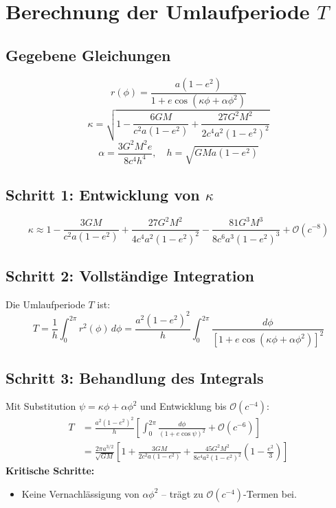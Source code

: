 \newpage
\section{Berechnung der Umlaufperiode \( T \)}

\subsection*{Gegebene Gleichungen}
\begin{equation}
r(\phi) = \frac{a(1-e^2)}{1 + e\cos\left(\kappa\phi + \alpha\phi^2\right)} \label{eq:orbit}
\end{equation}
\begin{equation}
\kappa = \sqrt{1 - \frac{6GM}{c^2a(1-e^2)} + \frac{27G^2M^2}{2c^4a^2(1-e^2)^2}} \label{eq:kappa}
\end{equation}
\begin{equation}
\alpha = \frac{3G^2M^2e}{8c^4h^4}, \quad h = \sqrt{GMa(1-e^2)} \label{eq:alpha}
\end{equation}

\subsection*{Schritt 1: Entwicklung von \(\kappa\)}
\begin{equation}
\kappa \approx 1 - \frac{3GM}{c^2a(1-e^2)} + \frac{27G^2M^2}{4c^4a^2(1-e^2)^2} - \frac{81G^3M^3}{8c^6a^3(1-e^2)^3} + \mathcal{O}(c^{-8}) 
\end{equation}

\subsection*{Schritt 2: Vollständige Integration}
Die Umlaufperiode \( T \) ist:
\begin{equation}
T = \frac{1}{h} \int_0^{2\pi} r^2(\phi) \, d\phi = \frac{a^2(1-e^2)^2}{h} \int_0^{2\pi} \frac{d\phi}{\left[1 + e\cos\left(\kappa\phi + \alpha\phi^2\right)\right]^2} \label{eq:T_integral}
\end{equation}

\subsection*{Schritt 3: Behandlung des Integrals}
Mit Substitution \(\psi = \kappa\phi + \alpha\phi^2\) und Entwicklung bis \(\mathcal{O}(c^{-4})\):
\begin{align}
T &= \frac{a^2(1-e^2)^2}{h} \left[ \int_0^{2\pi} \frac{d\phi}{(1 + e\cos\psi)^2} + \mathcal{O}(c^{-6}) \right] \\
  &= \frac{2\pi a^{3/2}}{\sqrt{GM}} \left[1 + \frac{3GM}{2c^2a(1-e^2)} + \frac{45G^2M^2}{8c^4a^2(1-e^2)^2}\left(1 - \frac{e^2}{3}\right)\right] \label{eq:T_final}
\end{align}
\textbf{Kritische Schritte:}
\begin{itemize}
\item Keine Vernachlässigung von \(\alpha\phi^2\) – trägt zu \(\mathcal{O}(c^{-4})\)-Termen bei.
\end{itemize}


